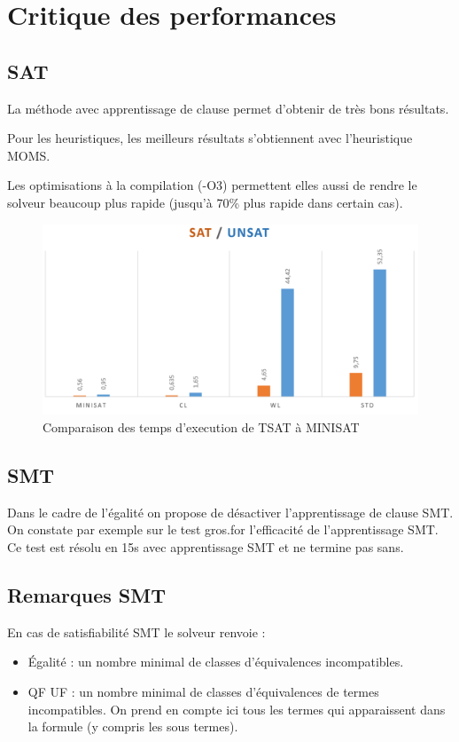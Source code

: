 \documentclass{article}
\begin{document}
\section{Critique des performances}
\subsection{SAT}
La méthode avec apprentissage de clause permet d'obtenir de très bons résultats.

Pour les heuristiques, les meilleurs résultats s'obtiennent avec l'heuristique MOMS.

Les optimisations à la compilation (-O3) permettent elles aussi de rendre le solveur beaucoup plus rapide (jusqu'à 70\% plus rapide dans certain cas).
\\
\begin{figure}[h]
    \begin{center}
        \includegraphics[scale=0.25]{time.png}
    \end{center}
    \caption{Comparaison des temps d'execution de TSAT à MINISAT}
    \label{Comparaisons}
\end{figure}

\subsection{SMT}
Dans le cadre de l'égalité on propose de désactiver l'apprentissage de clause SMT. On constate par exemple sur le test gros.for l'efficacité de l'apprentissage SMT. Ce test est résolu en 15s avec apprentissage SMT et ne termine pas sans.

\subsection{Remarques SMT}

En cas de satisfiabilité SMT le solveur renvoie : 
\begin{itemize}
\item Égalité : un nombre minimal de classes d'équivalences incompatibles.
\item QF UF : un nombre minimal de classes d'équivalences de termes incompatibles. On prend en compte ici tous les termes qui apparaissent dans la formule (y compris les sous termes).

\end{itemize}
\end{document}
